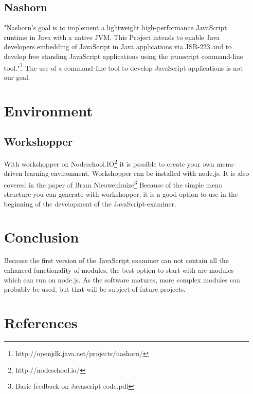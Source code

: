 \documentclass{article}
\begin{document}
\subsection{Nashorn}
"Nashorn's goal is to implement a lightweight high-performance JavaScript runtime in Java with a native JVM.
This Project intends to enable Java developers embedding of JavaScript in Java applications via JSR-223 and to develop 
free standing JavaScript applications using the jrunscript command-line tool."\footnote{http://openjdk.java.net/projects/nashorn/}
The use of a command-line tool to develop JavaScript applications is not our goal.

\section{Environment}
\subsection{Workshopper}
With workshopper on Nodeschool.IO\footnote{http://nodeschool.io/} it is possible to create your own menu-driven learning environment. 
Workshopper can be installed with node.js.
It is also covered in the paper of Bram Nieuwenhuize\footnote{Basic feedback on Javascript code.pdf}
Because of the simple menu structure you can generate with workshopper, it is a good option to use in the beginning of the development of the JavaScript-examiner.

\section{Conclusion}
Because the first version of the JavaScript examiner can not contain all the enhanced functionality of modules, the best option to start with are modules which can run on node.js.
As the software matures, more complex modules can probably be used, but that will be subject of future projects.

\section{References}
\end{document}
